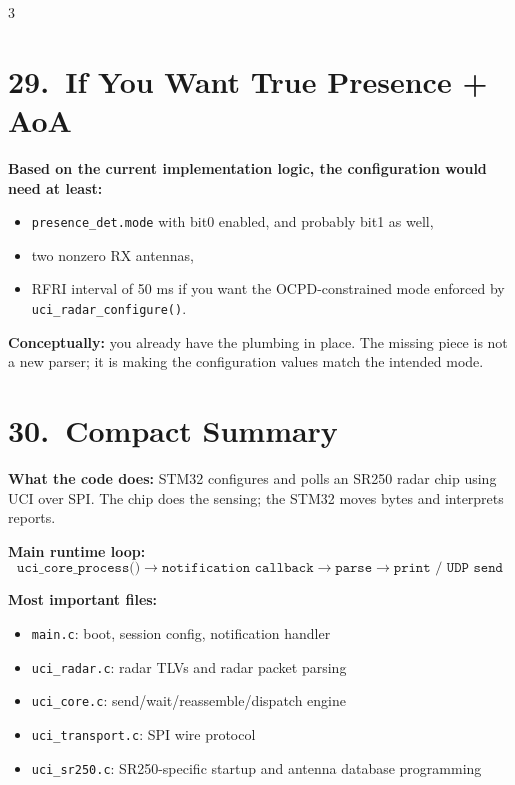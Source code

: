 \documentclass[10pt]{article}
\begin{document}
\begin{multicols*}{3}
\section*{29.\ If You Want True Presence + AoA}

\textbf{Based on the current implementation logic, the configuration would need at least:}
\begin{itemize}
  \item \texttt{presence\_det.mode} with bit0 enabled, and probably bit1 as well,
  \item two nonzero RX antennas,
  \item RFRI interval of 50 ms if you want the OCPD-constrained mode enforced by \texttt{uci\_radar\_configure()}.
\end{itemize}

\textbf{Conceptually:}
you already have the plumbing in place.
The missing piece is not a new parser; it is making the configuration values match the intended mode.

\section*{30.\ Compact Summary}

\begin{tcolorbox}[summarybox={SR250 Radar Firmware --- Quick Reference}]
\textbf{What the code does:}
STM32 configures and polls an SR250 radar chip using UCI over SPI.
The chip does the sensing; the STM32 moves bytes and interprets reports.

\smallskip
\textbf{Main runtime loop:}
\[
\texttt{uci\_core\_process()}
\rightarrow
\texttt{notification callback}
\rightarrow
\texttt{parse}
\rightarrow
\texttt{print / UDP send}
\]

\textbf{Most important files:}
\begin{itemize}
  \item \texttt{main.c}: boot, session config, notification handler
  \item \texttt{uci\_radar.c}: radar TLVs and radar packet parsing
  \item \texttt{uci\_core.c}: send/wait/reassemble/dispatch engine
  \item \texttt{uci\_transport.c}: SPI wire protocol
  \item \texttt{uci\_sr250.c}: SR250-specific startup and antenna database programming
\end{itemize}


\end{tcolorbox}
\end{multicols*}
\end{document}
